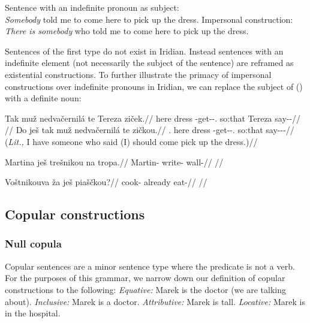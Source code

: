 \pex
\a  {}Sentence with an indefinite pronoun as subject:\\
    \emph{Somebody} told me to come here to pick up the dress.
\a  Impersonal construction:\\
    \emph{There is somebody} who told me to come here to pick up the dress.
\xe

Sentences of the first type do not exist in Iridian. Instead sentences with an
indefinite element (not necessarily the subject of the sentence) are reframed as
existential constructions. To further illustrate the primacy of impersonal
constructions over indefinite pronouns in Iridian, we can replace the subject of
() with a definite noun:

\pex
\a\begingl
    \gla Tak muž nedvačernilá te Tereza ziček.//
    \glb here dress \Caus{}-get-\Pv{}-\Subj{}.\Ipf{} so:that Tereza say-\Av{}-\Pf{}//
    \glft {}//
  \endgl
\a\begingl
    \gla Do ješ tak muž nedvačernilá te zičkou.//
    \glb \First{}\Sg{}.\Acc{} \Exst{} here dress \Caus{}-get-\Pv{}-\Subj{}.\Ipf{} so:that say-\Av{}-\Pf{}-\Nz{}//
    \glft {} (\emph{Lit.,} I have someone who said (I) should come pick up the dress.)//
  \endgl
\xe


\pex
\begingl
\gla Martina ješ trešnikou na tropa.//
\glb Martin-\Acc{} \Exst{} write- \Loc{} wall-\Acc{}//
\glft {}//
\endgl
\xe

\pex
\begingl
\gla Voštnikouva ža ješ piaščkou?//
\glb cook- already \Exst{} eat-//
\glft {}//
\endgl
\xe

\subsection{Copular constructions}
\subsubsection{Null copula}

Copular sentences are a minor sentence type where the predicate is not a verb.
For the purposes of this grammar, we narrow down our definition of copular
constructions to the following:
\pex
\a \textit{Equative:} Marek is the doctor (we are talking about).
\a \textit{Inclusive:} Marek is a doctor.
\a \textit{Attributive:} Marek is tall.
\a \textit{Locative:} Marek is in the hospital.
\xe

